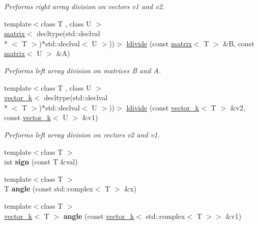 \begin{DoxyCompactItemize}
\begin{DoxyCompactList}\small\item\em Performs right array division on vectors v1 and v2. \end{DoxyCompactList}\item 
{\footnotesize template$<$class T , class U $>$ }\\\hyperlink{classkeycpp_1_1matrix}{matrix}$<$ decltype(std\-::declval\\*
$<$ T $>$)$\ast$std\-::declval$<$ U $>$))$>$ \hyperlink{namespacekeycpp_ac57d32902cba2c399475015235aeccec}{ldivide} (const \hyperlink{classkeycpp_1_1matrix}{matrix}$<$ T $>$ \&B, const \hyperlink{classkeycpp_1_1matrix}{matrix}$<$ U $>$ \&A)
\begin{DoxyCompactList}\small\item\em Performs left array division on matrices B and A. \end{DoxyCompactList}\item 
{\footnotesize template$<$class T , class U $>$ }\\\hyperlink{classkeycpp_1_1vector__k}{vector\-\_\-k}$<$ decltype(std\-::declval\\*
$<$ T $>$)$\ast$std\-::declval$<$ U $>$))$>$ \hyperlink{namespacekeycpp_acee6d21e4a11f11422cc5f47d37c0e72}{ldivide} (const \hyperlink{classkeycpp_1_1vector__k}{vector\-\_\-k}$<$ T $>$ \&v2, const \hyperlink{classkeycpp_1_1vector__k}{vector\-\_\-k}$<$ U $>$ \&v1)
\begin{DoxyCompactList}\small\item\em Performs left array division on vectors v2 and v1. \end{DoxyCompactList}\item 
\hypertarget{namespacekeycpp_a87f2917e6a7c8e20d010aea0d8480668}{{\footnotesize template$<$class T $>$ }\\int {\bfseries sign} (const T \&val)}\label{namespacekeycpp_a87f2917e6a7c8e20d010aea0d8480668}

\item 
\hypertarget{namespacekeycpp_aaa2e17334911e8a447a5ef6c0cc54c3f}{{\footnotesize template$<$class T $>$ }\\T {\bfseries angle} (const std\-::complex$<$ T $>$ \&x)}\label{namespacekeycpp_aaa2e17334911e8a447a5ef6c0cc54c3f}

\item 
\hypertarget{namespacekeycpp_ab4fe7e0308538622ae7d0b3a45182e0b}{{\footnotesize template$<$class T $>$ }\\\hyperlink{classkeycpp_1_1vector__k}{vector\-\_\-k}$<$ T $>$ {\bfseries angle} (const \hyperlink{classkeycpp_1_1vector__k}{vector\-\_\-k}$<$ std\-::complex$<$ T $>$$>$ \&v1)}\label{namespacekeycpp_ab4fe7e0308538622ae7d0b3a45182e0b}


\end{DoxyCompactItemize}
